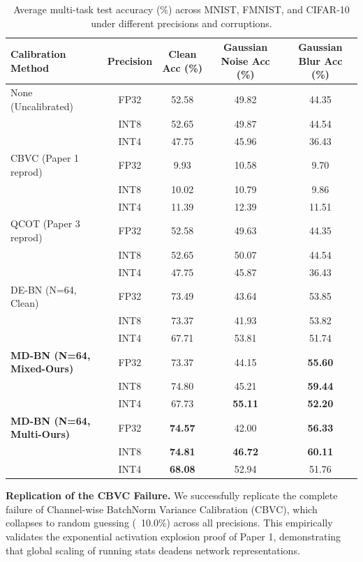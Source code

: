 \documentclass{article}
\theoremstyle{plain}
\theoremstyle{definition}
\theoremstyle{remark}
\begin{document}
\begin{table}[t]
\caption{Average multi-task test accuracy (\%) across MNIST, FMNIST, and CIFAR-10 under different precisions and corruptions.}
\label{tab:main_results}
\begin{center}
\begin{small}
\begin{tabular}{l c c c c}
\toprule
\textbf{Calibration Method} & \textbf{Precision} & \textbf{Clean Acc (\%)} & \textbf{Gaussian Noise Acc (\%)} & \textbf{Gaussian Blur Acc (\%)} \\
\midrule
None (Uncalibrated) & FP32 & 52.58 & 49.82 & 44.35 \\
& INT8 & 52.65 & 49.87 & 44.54 \\
& INT4 & 47.75 & 45.96 & 36.43 \\
\midrule
CBVC (Paper 1 reprod) & FP32 & 9.93 & 10.58 & 9.70 \\
& INT8 & 10.02 & 10.79 & 9.86 \\
& INT4 & 11.39 & 12.39 & 11.51 \\
\midrule
QCOT (Paper 3 reprod) & FP32 & 52.58 & 49.63 & 44.35 \\
& INT8 & 52.65 & 50.07 & 44.54 \\
& INT4 & 47.75 & 45.87 & 36.43 \\
\midrule
DE-BN (N=64, Clean) & FP32 & 73.49 & 43.64 & 53.85 \\
& INT8 & 73.37 & 41.93 & 53.82 \\
& INT4 & 67.71 & 53.81 & 51.74 \\
\midrule
\textbf{MD-BN (N=64, Mixed-Ours)} & FP32 & 73.37 & 44.15 & \textbf{55.60} \\
& INT8 & 74.80 & 45.21 & \textbf{59.44} \\
& INT4 & 67.73 & \textbf{55.11} & \textbf{52.20} \\
\midrule
\textbf{MD-BN (N=64, Multi-Ours)} & FP32 & \textbf{74.57} & 42.00 & \textbf{56.33} \\
& INT8 & \textbf{74.81} & \textbf{46.72} & \textbf{60.11} \\
& INT4 & \textbf{68.08} & 52.94 & 51.76 \\
\bottomrule
\end{tabular}
\end{small}
\end{center}
\end{table}

\textbf{Replication of the CBVC Failure.} We successfully replicate the complete failure of Channel-wise BatchNorm Variance Calibration (CBVC), which collapses to random guessing (~10.0\%) across all precisions. This empirically validates the exponential activation explosion proof of Paper 1, demonstrating that global scaling of running stats deadens network representations.
\end{document}
